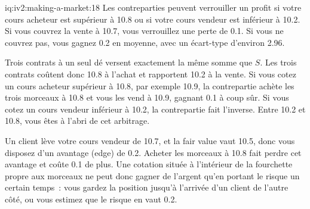 \begin{solution}{iq:iv2:making-a-market:18}
Les contreparties peuvent verrouiller un profit si votre cours acheteur est supérieur à 10.8 ou si votre cours vendeur est inférieur à 10.2. Si vous couvrez la vente à 10.7, vous verrouillez une perte de 0.1. Si vous ne couvrez pas, vous gagnez 0.2 en moyenne, avec un écart-type d'environ 2.96.

Trois contrats à un seul dé versent exactement la même somme que $S$. Les trois contrats coûtent donc 10.8 à l'achat et rapportent 10.2 à la vente. Si vous cotez un cours acheteur supérieur à 10.8, par exemple 10.9, la contrepartie achète les trois morceaux à 10.8 et vous les vend à 10.9, gagnant 0.1 à coup sûr. Si vous cotez un cours vendeur inférieur à 10.2, la contrepartie fait l'inverse. Entre 10.2 et 10.8, vous êtes à l'abri de cet arbitrage.

Un client lève votre cours vendeur de 10.7, et la fair value vaut 10.5, donc vous disposez d'un avantage (edge) de 0.2. Acheter les morceaux à 10.8 fait perdre cet avantage et coûte 0.1 de plus. Une cotation située à l'intérieur de la fourchette propre aux morceaux ne peut donc gagner de l'argent qu'en portant le risque un certain temps~: vous gardez la position jusqu'à l'arrivée d'un client de l'autre côté, ou vous estimez que le risque en vaut 0.2.

\end{solution}

